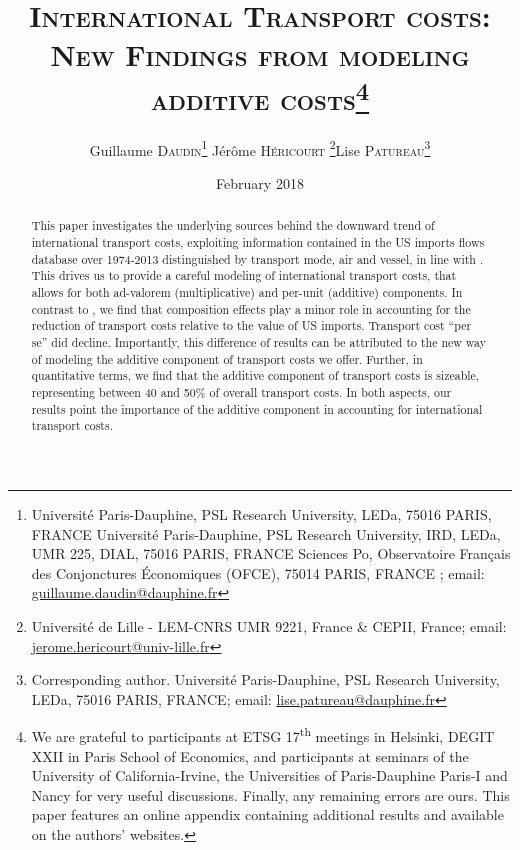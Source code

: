 \documentclass[a4paper,11pt]{article}
\begin{document}
\title{\textsc{International Transport costs:\\New Findings from modeling additive costs}\thanks{We are grateful to participants at ETSG 17\textsuperscript{th} meetings in Helsinki, DEGIT XXII in Paris School of Economics, and participants at seminars of the University of California-Irvine, the Universities of Paris-Dauphine Paris-I and Nancy for very useful discussions. Finally, any remaining errors are ours. This paper features an online appendix containing additional results and available on the authors' websites.}}

\author{Guillaume \textsc{Daudin}\thanks{%
Universit\'{e} Paris-Dauphine, PSL Research University, LEDa, 75016 PARIS, FRANCE \newline
Universit\'{e} Paris-Dauphine, PSL Research University, IRD, LEDa, UMR 225, DIAL, 75016 PARIS, FRANCE \newline
Sciences Po, Observatoire Fran\c{c}ais des Conjonctures \'{E}conomiques (OFCE), 75014 PARIS, FRANCE \newline
; email: \url{guillaume.daudin@dauphine.fr}}  \qquad J\'{e}r\^{o}me \textsc{H\'{e}ricourt} \thanks{Universit\'{e} de Lille - LEM-CNRS UMR 9221, France \& CEPII, France; email: \url{jerome.hericourt@univ-lille.fr}}\qquad Lise \textsc{Patureau}\thanks{Corresponding author. Universit\'{e} Paris-Dauphine, PSL Research University, LEDa, 75016 PARIS, FRANCE;  email: \url{lise.patureau@dauphine.fr} } }





\date{February 2018}
 \maketitle
\bigskip

\begin{abstract}
This paper investigates the underlying sources behind the downward trend of international transport costs, exploiting information contained in the US imports flows database over 1974-2013 distinguished by transport mode, air and vessel, in line with \cite{hummels2007}. This drives us to provide a careful modeling of international transport costs, that allows for both ad-valorem (multiplicative) and per-unit (additive) components. In contrast to \cite{hummels2007}, we find that composition effects play a minor role in accounting for the reduction of transport costs relative to the value of US imports. Transport cost ``per se'' did decline. Importantly, this difference of results can be attributed to the new way of modeling the additive component of transport costs we offer. Further, in quantitative terms, we find that the additive component of transport costs is sizeable, representing between 40 and 50\% of overall transport costs. In both aspects, our results point the importance of the additive component in accounting for international transport costs.
\end{abstract}
\end{document}
